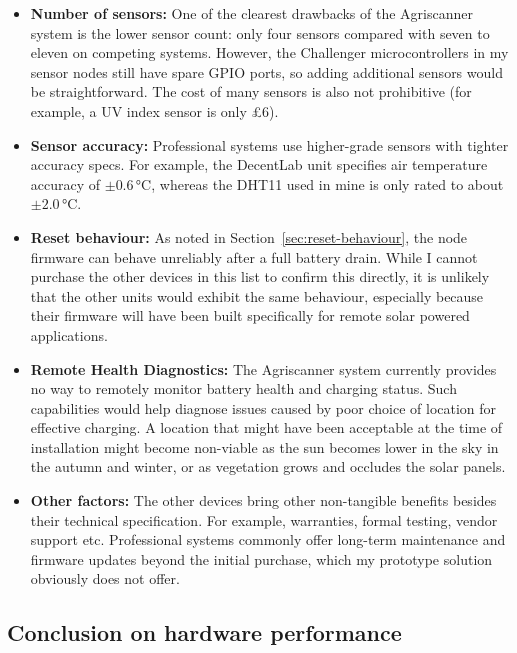 \begin{itemize}
  \item \textbf{Number of sensors:} One of the clearest drawbacks of the
        Agriscanner system is the lower sensor count: only four sensors compared
        with seven to eleven on competing systems. However, the Challenger
        microcontrollers in my sensor nodes still have spare GPIO ports, so
        adding additional sensors would be straightforward. The cost of many
        sensors is also not prohibitive (for example, a UV index sensor is only
        \pounds{}6).
  \item \textbf{Sensor accuracy:} Professional systems use higher-grade sensors
        with tighter accuracy specs. For example, the DecentLab unit specifies
        air temperature accuracy of $\pm0.6\,\si{\celsius}$, whereas the DHT11
        used in mine is only rated to about $\pm2.0\,\si{\celsius}$.
  \item \textbf{Reset behaviour:} As noted in Section~\ref{sec:reset-behaviour},
        the node firmware can behave unreliably after a full battery drain.
        While I cannot purchase the other devices in this list to confirm this
        directly, it is unlikely that the other units would exhibit the same
        behaviour, especially because their firmware will have been built
        specifically for remote solar powered applications.
  \item \textbf{Remote Health Diagnostics:} The Agriscanner system currently
        provides no way to remotely monitor battery health and charging status.
        Such capabilities would help diagnose issues caused by poor choice of
        location for effective charging. A location that might have been
        acceptable at the time of installation might become non-viable as the
        sun becomes lower in the sky in the autumn and winter, or as vegetation
        grows and occludes the solar panels.
  \item \textbf{Other factors:} The other devices bring other non-tangible
        benefits besides their technical specification. For example, warranties,
        formal testing, vendor support etc. Professional systems commonly offer
        long-term maintenance and firmware updates beyond the initial purchase,
        which my prototype solution obviously does not offer.
\end{itemize}

\subsection{Conclusion on hardware performance}

